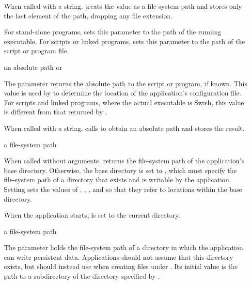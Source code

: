 When called with a string,  treats the value as
a file-system path and stores only the last element of the path,
dropping any file extension.

For stand-alone programs, 
sets this parameter to the path of the running executable.
For scripts or linked programs, 
sets this parameter to the path of the script or program file.

\begin{parameter}
\end{parameter}
\hasvalue{} an absolute path or 

The  parameter returns the absolute path to the script or
program, if known.
This value is used by  to determine the
location of the application's configuration file.
For scripts and linked programs, where the actual executable is Swish, this
value is different from that returned by .

When called with a string,  calls  to
obtain an absolute path and stores the result.

\begin{parameter}
\end{parameter}
\hasvalue{} a file-system path

When called without arguments,  returns the file-system path of
the application's base directory.
Otherwise, the base directory is set to , which must specify the
file-system path of a directory that exists and is writable by the application.
Setting  sets the values of , ,
, and  so that they refer to locations within the
base directory.

When the application starts,  is set to the current directory.

\begin{parameter}
\end{parameter}
\hasvalue{} a file-system path

The  parameter holds the file-system path of a directory
in which the application can write persistent data.
Applications should not assume that this directory exists, but should
instead use  when creating files under .
Its initial value is the path to a  subdirectory of
the directory specified by .

